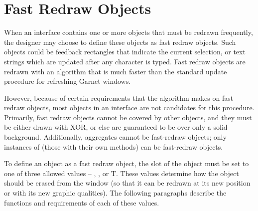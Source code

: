 \section{Fast Redraw Objects}
\label{fast-redraw-objects}
When an interface contains one or more objects that must be redrawn
frequently, the designer may choose to define these objects as fast
redraw objects.  Such objects could be feedback rectangles
that indicate the current selection, or text strings which are updated
after any character is typed.  Fast redraw objects are redrawn with an
algorithm that is much faster than the standard update procedure for
refreshing Garnet windows.

However, because of certain requirements
that the algorithm makes on fast redraw objects, most objects in an
interface are not candidates for this procedure.  Primarily, fast
redraw objects cannot be covered by other objects, and they must be
either drawn with XOR, or else are guaranteed to be over only a solid
background.  Additionally, aggregates cannot be fast-redraw objects;
only instances of  (those with their own 
methods) can be fast-redraw objects.

To define an object as a fast redraw object, the 
slot of the object must be set to one of three allowed values --
, , or T.  These values determine how the
object should be erased from the window (so that it can be redrawn at
its new position or with its new graphic qualities).  The following
paragraphs describe the functions and requirements of each of these values.


